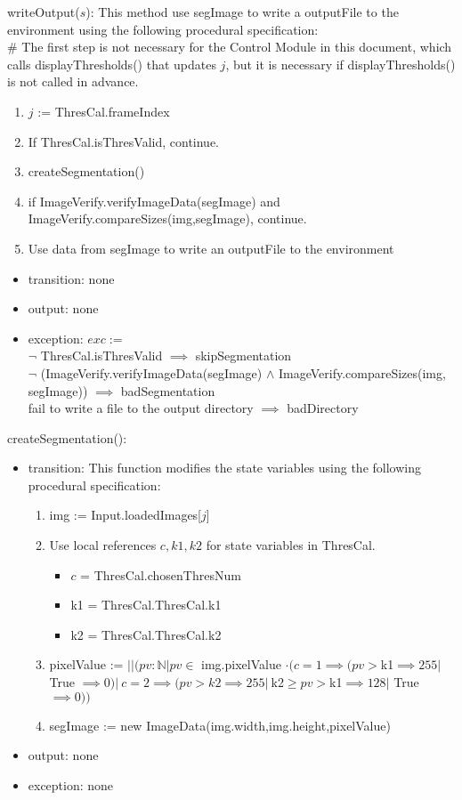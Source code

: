 \documentclass[12pt, titlepage]{article}
\begin{document}
\noindent writeOutput($s$):
This method use segImage to write a outputFile to the environment using the
following procedural specification:\\

\# The first step is not necessary for the Control Module in this document,
which calls displayThresholds() that updates $j$, but it is necessary if
displayThresholds() is not called in advance.
\begin{enumerate}
\item $j$ := ThresCal.frameIndex
\item If ThresCal.isThresValid, continue.
\item createSegmentation()
\item if ImageVerify.verifyImageData(segImage) and
ImageVerify.compareSizes(img,segImage), continue.
\item Use data from segImage to write an outputFile to the environment
\end{enumerate}
\begin{itemize}
\item transition: none
\item output: none
\item exception: $exc := $\\
$\neg$ ThresCal.isThresValid $\implies$ skipSegmentation\\
$\neg$ (ImageVerify.verifyImageData(segImage) $\land$
ImageVerify.compareSizes(img, segImage)) $\implies$ badSegmentation\\
fail to write a file to the output directory
$\implies$ badDirectory\\
\end{itemize}

\noindent createSegmentation():
\begin{itemize}
\item transition:
This function modifies the state variables using the following procedural
specification:
\begin{enumerate}
\item img := Input.loadedImages[$j$]
\item Use local references $c, k1, k2$ for state variables in ThresCal.
\begin{itemize}
\item $c$ = ThresCal.chosenThresNum
\item k1 = ThresCal.ThresCal.k1
\item k2 = ThresCal.ThresCal.k2
\end{itemize}
\item pixelValue := $|| (pv: \mathbb{N} | pv \in$ img.pixelValue $\cdot (c =
1 \implies (pv > $k1$ \implies 255 |$ True $\implies 0) |\ c = 2 \implies (pv >
k2 \implies 255 |\ $k2$ \ge pv > $k1$ \implies
128 |$ True $\implies 0))$
    \item
    segImage := new ImageData(img.width,img.height,pixelValue)
\end{enumerate}
\item output: none
\item exception: none
\end{itemize}
\end{document}
